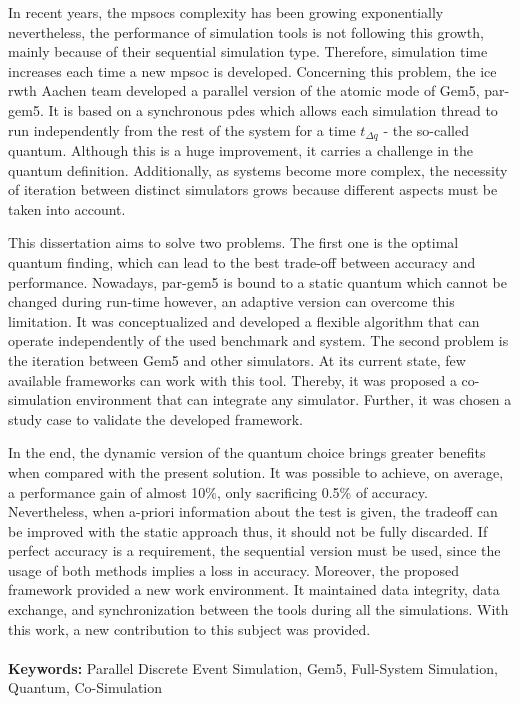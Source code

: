 





\vspace*{-0.5cm}

In recent years, the \glspl{mpsoc} complexity has been growing exponentially nevertheless, the performance of simulation tools is not 
following this growth, mainly because of their sequential simulation type. Therefore, simulation time increases each time a new \gls{mpsoc} 
is developed. Concerning this problem, the \gls{ice} \gls{rwth} Aachen team developed a parallel version of the atomic mode of Gem5, par-gem5. 
It is based on a synchronous \gls{pdes} which allows each simulation thread to run independently from the rest of the system for a time 
$t_{\Delta q}$ - the so-called quantum. Although this is a huge improvement, it carries a challenge in the quantum definition. 
Additionally, as systems become more complex, the necessity of iteration between distinct simulators grows because different aspects must be 
taken into account. 

This dissertation aims to solve two problems. The first one is the optimal quantum finding, which can lead to the best trade-off between 
accuracy and performance. Nowadays, par-gem5 is bound to a static quantum which cannot be changed during run-time however, an adaptive 
version can overcome this limitation. It was conceptualized and developed a flexible algorithm that can operate independently of 
the used benchmark and system. The second problem is the iteration between Gem5 and other simulators. At its current state, few available 
frameworks can work with this tool. Thereby, it was proposed a co-simulation environment that can integrate any 
simulator. Further, it was chosen a study case to validate the developed framework.

In the end, the dynamic version of the quantum choice brings greater benefits when compared with the present solution. It was possible to achieve, 
on average, a performance gain of almost 10\%, only sacrificing 0.5\% of accuracy. Nevertheless, when a-priori information about the 
test is given, the tradeoff can be improved with the static approach thus, it should not be fully discarded. 
If perfect accuracy is a requirement, the sequential version must be used, since the usage of both methods implies a loss in accuracy. 
Moreover, the proposed framework provided a new work environment. It maintained data integrity, data exchange, and synchronization 
between the tools during all the simulations. With this work, a new contribution to this subject was provided.

\paragraph{}\textbf{Keywords:} Parallel Discrete Event Simulation, Gem5, Full-System Simulation, Quantum, Co-Simulation
